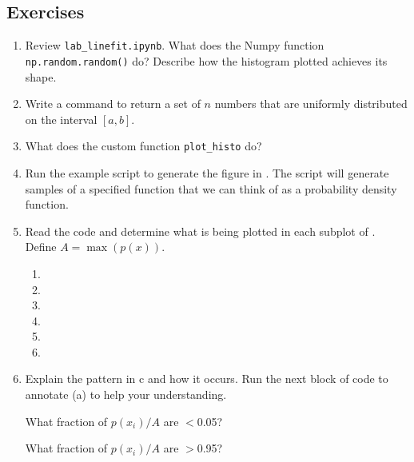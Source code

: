 \documentclass[11pt,titlepage,fleqn]{article}
\begin{document}


\pagebreak
\subsection*{Exercises}

\begin{enumerate}
\item Review \verb+lab_linefit.ipynb+. What does the Numpy function \verb+np.random.random()+ do? Describe how the histogram plotted achieves its shape.

\vertgap

\item Write a command to return a set of $n$ numbers that are uniformly distributed on the interval $[a,b]$.

\vertgap

\item What does the custom function \verb+plot_histo+ do?

\vertgap

\item Run the example script to generate the figure in . The script will generate samples of a specified function that we can think of as a probability density function.

\item Read the code and determine what is being plotted in each subplot of . \\
Define $A = \max(p(x))$.
%
\begin{spacing}{2.0}
\begin{enumerate}
\item 
\item 
\item 
\item 
\item 
\item 
\end{enumerate}
\end{spacing}

\item Explain the pattern in c and how it occurs. Run the next block of code to annotate (a) to help your understanding.

What fraction of $p(x_i)/A$ are $<$0.05?

What fraction of $p(x_i)/A$ are $>$0.95?


\end{enumerate}
\end{document}
